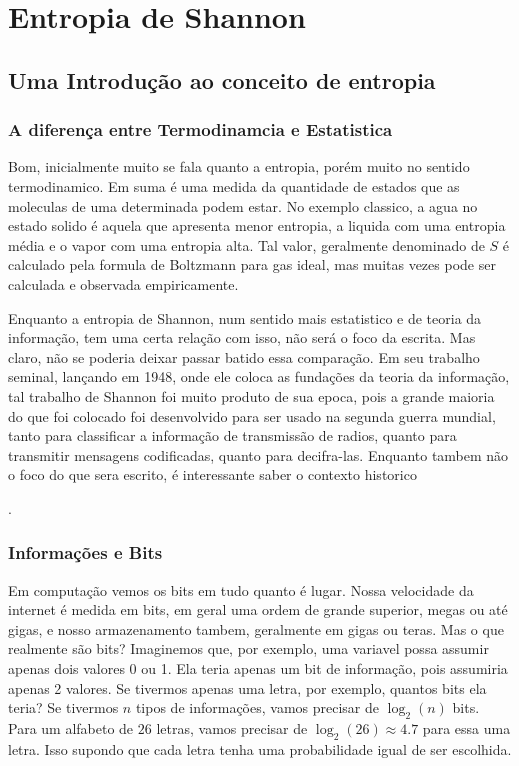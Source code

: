 \chapter{Entropia de Shannon}
\section{Uma Introdução ao conceito de entropia}
\subsection{A diferença entre Termodinamcia e Estatistica}
Bom, inicialmente muito se fala quanto a entropia, porém muito no sentido termodinamico. Em suma é
uma medida da quantidade de estados que as moleculas de uma determinada podem estar. No exemplo
classico, a agua no estado solido é aquela que apresenta menor entropia, a liquida com uma entropia
média e o vapor com uma entropia alta. Tal valor, geralmente denominado de \(S\) é calculado pela
formula de Boltzmann para gas ideal, mas muitas vezes pode ser calculada e observada
empiricamente.\par

Enquanto a entropia de Shannon, num sentido mais estatistico e de teoria da informação, tem uma
certa relação com isso, não será o foco da escrita. Mas claro, não se poderia deixar passar batido
essa comparação. Em seu trabalho seminal, lançando em 1948, onde ele coloca as fundações da teoria
da informação, tal trabalho de Shannon foi muito produto de sua epoca, pois a grande maioria do que
foi colocado foi desenvolvido para ser usado na segunda guerra mundial, tanto para classificar a
informação de transmissão de radios, quanto para transmitir mensagens codificadas, quanto para
decifra-las. Enquanto tambem não o foco do que sera escrito, é interessante saber o contexto
historico \par.

\subsection{Informações e Bits}
Em computação vemos os bits em tudo quanto é lugar. Nossa velocidade da internet é medida em bits,
em geral uma ordem de grande superior, megas ou até gigas, e nosso armazenamento tambem, geralmente
em gigas ou teras. Mas o que realmente são bits? Imaginemos que, por exemplo, uma variavel possa
assumir apenas dois valores 0 ou 1. Ela teria apenas um bit de informação, pois assumiria apenas 2
valores. Se tivermos apenas uma letra, por exemplo, quantos bits ela teria? Se tivermos \(n\) tipos
de informações, vamos precisar de \(\log_{2}(n) \) bits. Para um alfabeto de \(26\) letras, vamos
precisar de \(\log_2(26) \approx 4.7\) para essa uma letra. Isso supondo que cada letra tenha uma
probabilidade igual de ser escolhida. \par

